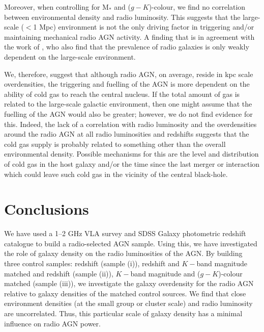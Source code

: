 Moreover, when controlling for M$_*$ and ($g-K$)-colour, we find no correlation between environmental density and radio luminosity. This suggests that the large-scale ($<$1 Mpc) environment is not the only driving factor in triggering and/or maintaining mechanical radio AGN activity. A finding that is in agreement with the work of \cite{sabater2013}, who also find that the prevalence of radio galaxies is only weakly dependent on the large-scale environment.

We, therefore, suggest that although radio AGN, on average, reside in kpc scale overdensities, the triggering and fuelling of the AGN is more dependent on the ability of cold gas to reach the central nucleus. If the total amount of gas is related to the large-scale galactic environment, then one might assume that the fuelling of the AGN would also be greater; however, we do not find evidence for this. Indeed, the lack of a correlation with radio luminosity and the overdensities around the radio AGN at all radio luminosities and redshifts suggests that the cold gas supply is probably related to something other than the overall environmental density. Possible mechanisms for this are the level and distribution of cold gas in the host galaxy and/or the time since the last merger or interaction which could leave such cold gas in the vicinity of the central black-hole. 


\section{Conclusions}\label{section-5}
We have used a 1--2 GHz VLA survey and SDSS Galaxy photometric redshift catalogue to build a radio-selected AGN sample. Using this, we have investigated the role of galaxy density on the radio luminosities of the AGN. By building three control samples: redshift (sample (i)), redshift and $K-$band magnitude matched and redshift (sample (ii)), $K-$band magnitude and ($g-K$)-colour matched (sample (iii)), we investigate the galaxy overdensity for the radio AGN relative to galaxy densities of the matched control sources. We find that close environment densities (at the small group or cluster scale) and radio luminosity are uncorrelated. Thus, this particular scale of galaxy density has a minimal influence on radio AGN power. 

